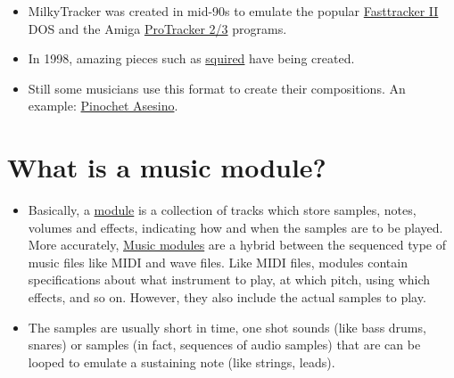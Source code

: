 \begin{itemize}
\item MilkyTracker was created in mid-90s to emulate the popular
  \href{http://en.wikipedia.org/wiki/FastTracker_2}{Fasttracker II}
  DOS and the Amiga
  \href{http://sourceforge.net/projects/protracker/}{ProTracker 2/3} 
  programs.

\item In 1998, amazing pieces such as
  \href{http://modarchive.org/index.php?request=view_by_moduleid\&query=58684}{squired}
  have being created.

\item Still some musicians use this format to create their
  compositions. An example:
  \href{http://modarchive.org/index.php?request=view_by_moduleid\&query=173932}{Pinochet
    Asesino}.

\end{itemize}

\section{What is a music module?}
\begin{itemize}
\item Basically, a
  \href{http://en.wikipedia.org/wiki/MOD\_\%28file_format\%29}{module}
  is a collection of tracks which store samples, notes, volumes and
  effects, indicating how and when the samples are to be played. More
  accurately,
  \href{http://www.wildbunny.co.uk/blog/2012/05/15/composing-in-game-music/}{Music
    modules} are a hybrid between the sequenced type of music files
  like MIDI and wave files. Like MIDI files, modules contain
  specifications about what instrument to play, at which pitch, using
  which effects, and so on. However, they also include the actual
  samples to play.

\item The samples are usually short in time, one shot sounds (like
  bass drums, snares) or samples (in fact, sequences of audio samples)
  that are can be looped to emulate a sustaining note (like strings,
  leads). 


\end{itemize}

